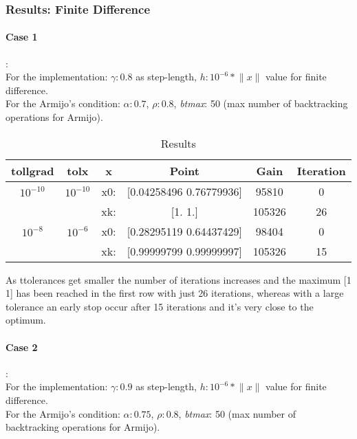 \documentclass{article}
\begin{document}
\subsubsection{Results: Finite Difference}
\paragraph{Case 1}:\\

For the implementation: ${\gamma:0.8 }$ as step-length, $h: 10^{-6}*\lVert x \rVert$ value for finite difference.\\
For the Armijo's condition: $\alpha:0.7$, $\rho: 0.8$, \emph{btmax}: 50 (max number of backtracking operations for Armijo).

\begin{table}[h!]
\centering
 \begin{tabular}{|c c c c c c|} 
 \hline
 tollgrad & tolx & x & Point & Gain & Iteration \\ [0.5ex] 
 \hline\hline

  $10^{-10}$ & $10^{-10}$ &  x0: &[0.04258496 0.76779936] & 95810 & 0 \\ 
  &  & xk: & [1. 1.] & 105326 & 26 \\
  \hline
   $10^{-8}$ & $10^{-6}$ & x0: &[0.28295119 0.64437429] & 98404 & 0 \\ 
  &  &xk: & [0.99999799 0.99999997] & 105326 & 15 \\
 \hline
 \end{tabular}
 \caption{Results}
\label{table:2}
\end{table}
As ttolerances get smaller the number of iterations increases and the maximum [1 1] has been reached in the first row with just 26 iterations, whereas with a large tolerance an early stop occur after 15 iterations and it's very close to the optimum.
\\
\paragraph{Case 2}:\\
For the implementation: ${\gamma:0.9 }$ as step-length, $h: 10^{-6}*\lVert x \rVert$ value for finite difference.\\
For the Armijo's condition: $\alpha:0.75$, $\rho: 0.8$, \emph{btmax}: 50 (max number of backtracking operations for Armijo).
\end{document}
